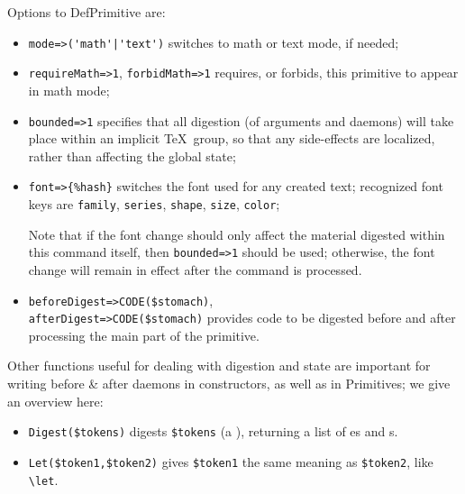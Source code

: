 \documentclass{book}
\newcommand{\ltxcode}{\lstinline[style=latexml]}
\begin{document}
Options to DefPrimitive are:
\begin{itemize}
\item \ltxcode.mode=>('math'|'text'). switches to math or text mode, if needed;
\item \ltxcode|requireMath=>1|, \ltxcode|forbidMath=>1| requires, or forbids,
  this primitive to appear in math mode;
\item \ltxcode|bounded=>1| specifies that all digestion (of arguments and daemons)
  will take place within an implicit \TeX\ group, so that any side-effects
  are localized, rather than affecting the global state;
\item \ltxcode|font=>{%
  switches the font used for any created text;
  recognized font keys are \texttt{family}, \texttt{series}, \texttt{shape}, \texttt{size}, \texttt{color};
  
  Note that if the font change should only affect the material digested within this
  command itself, then \ltxcode|bounded=>1| should be used; otherwise, the font
  change will remain in effect after the command is processed.
\item \ltxcode|beforeDigest=>CODE($stomach)|,\\
      \ltxcode|afterDigest=>CODE($stomach)|
  provides code to be digested before and after processing
  the main part of the primitive.
\end{itemize}


Other functions useful for dealing with digestion and state are important for
writing before \& after daemons in constructors, as well as in Primitives;
we give an overview here:
\begin{itemize}
\item \ltxcode|Digest($tokens)|
digests \ltxcode|$tokens| (a ), returning a list of es and s.
\item \ltxcode|Let($token1,$token2)| gives \ltxcode|$token1| the same meaning as \ltxcode|$token2|,
 like \verb|\let|.
\end{itemize}
\end{document}
